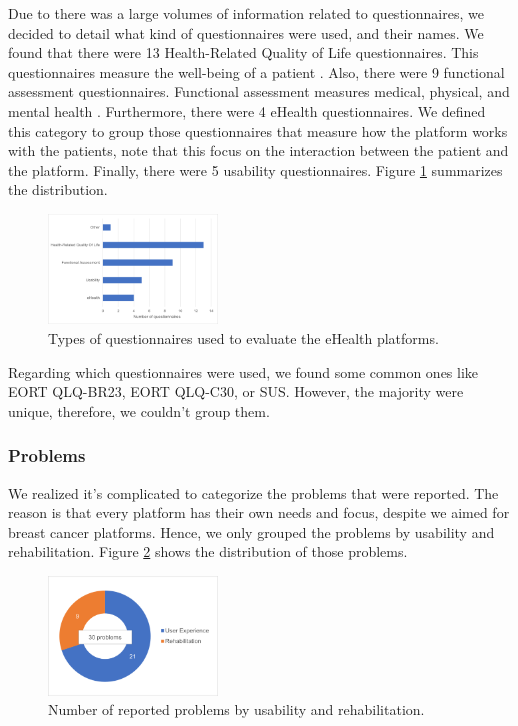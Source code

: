 \documentclass[conference]{IEEEtran}
\begin{document}
Due to there was a large volumes of information related to questionnaires, we decided to detail what kind of questionnaires were used, and their names. We found that there were 13 Health-Related Quality of Life questionnaires. This questionnaires measure the well-being of a patient \cite{Nahler2009}. Also, there were 9 functional assessment questionnaires. Functional assessment measures medical, physical, and mental health \cite{Sisto2018}. Furthermore, there were 4 eHealth questionnaires. We defined this category to group those questionnaires that measure how the platform works with the patients, note that this focus on the interaction between the patient and the platform. Finally, there were 5 usability questionnaires. Figure \ref{fig:questionnaires_types} summarizes the distribution.

\begin{figure}[h]
    \centering
\includegraphics[width=0.40\textwidth]{charts/questionnaires_types.png}
    \caption{Types of questionnaires used to evaluate the eHealth platforms.}
    \label{fig:questionnaires_types}
\end{figure}

Regarding which questionnaires were used, we found some common ones like EORT QLQ-BR23, EORT QLQ-C30, or SUS. However, the majority were unique, therefore, we couldn't group them.

\subsubsection{Problems}
\label{subsubsection:problems}


We realized it's complicated to categorize the problems that were reported. The reason is that every platform has their own needs and focus, despite we aimed for breast cancer platforms. Hence, we only grouped the problems by usability and rehabilitation. Figure \ref{fig:reported_problems} shows the distribution of those problems.
\begin{figure}[h]
    \centering
    \includegraphics[width=0.40\textwidth]{charts/reported_problems.png}
    \caption{Number of reported problems by usability and rehabilitation.}
    \label{fig:reported_problems}
\end{figure}
\end{document}
